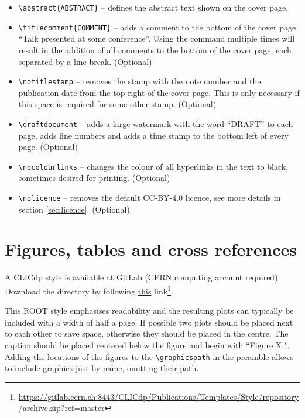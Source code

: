 \begin{itemize}
  \item \texttt{\textbackslash abstract\{ABSTRACT\}} -- defines the abstract text shown on the cover page.
  \item \texttt{\textbackslash titlecomment\{COMMENT\}} -- adds a comment to the bottom of the cover page, \ie ``Talk presented at some conference''.  Using the command multiple times will result in the addition of all comments to the bottom of the cover page, each separated by a line break. (Optional)
  \item \texttt{\textbackslash notitlestamp} -- removes the stamp with the note number and the publication date from the top right of the cover page. This is only necessary if this space is required for some other stamp. (Optional)
  \item \texttt{\textbackslash draftdocument} -- adds a large watermark with the word ``DRAFT'' to each page, adds line numbers and adds a time stamp to the bottom left of every page. (Optional)
  \item \texttt{\textbackslash nocolourlinks} -- changes the colour of all hyperlinks in the text to black, sometimes desired for printing. (Optional)
  \item \texttt{\textbackslash nolicence} -- removes the default CC-BY-4.0 licence, see more details in section \cref{sec:licence}. (Optional)
\end{itemize}


\section{Figures, tables and cross references}
\label{sec:figures}

A CLICdp \ROOT style is available at GitLab (CERN computing account required). Download the directory by following \href{https://gitlab.cern.ch:8443/CLICdp/Publications/Templates/Style/repository/archive.zip?ref=master}{this} link\footnote{\href{https://gitlab.cern.ch:8443/CLICd\
p/Publications/Templates/Style/repository/archive.zip?ref=master}{https://gitlab.cern.ch:8443/CLICdp/Publications/Templates/Style/repository/archive.zip?ref=master}}. 

This ROOT style emphasises readability and the resulting plots can typically be included with a width of half a page. If possible two plots should be placed next to each other to save space, otherwise they should be placed in the centre. The caption should be placed centered below the figure and begin with ``Figure X:". Adding the locations of the figures to the \texttt{\textbackslash graphicspath} in the preamble allows to include graphics just by name, omitting their path.

